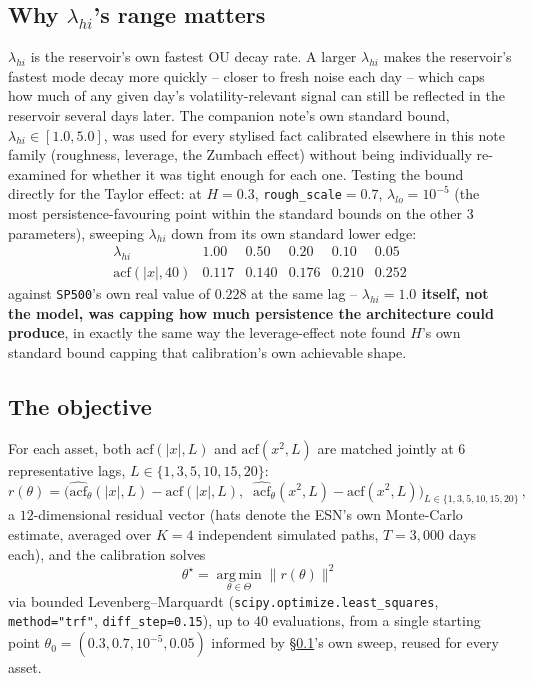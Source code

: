 \documentclass[11pt]{article}
\begin{document}
\subsection{Why $\lambda_{hi}$'s range matters}
\label{sec:whylh}
$\lambda_{hi}$ is the reservoir's own fastest OU decay rate. A larger
$\lambda_{hi}$ makes the reservoir's fastest mode decay more quickly --
closer to fresh noise each day -- which caps how much of any given day's
volatility-relevant signal can still be reflected in the reservoir several
days later. The companion note's own standard bound, $\lambda_{hi}\in[1.0,5.0]$,
was used for every stylised fact calibrated elsewhere in this note family
(roughness, leverage, the Zumbach effect) without being individually
re-examined for whether it was tight enough for each one. Testing the bound
directly for the Taylor effect: at $H=0.3$, \texttt{rough\_scale}$=0.7$,
$\lambda_{lo}=10^{-5}$ (the most persistence-favouring point within the
standard bounds on the other 3 parameters), sweeping $\lambda_{hi}$ down from
its own standard lower edge:
\[
\begin{array}{lcccccc}
\lambda_{hi} & 1.00 & 0.50 & 0.20 & 0.10 & 0.05 \\
\text{acf}(|x|,40) & 0.117 & 0.140 & 0.176 & 0.210 & 0.252
\end{array}
\]
against \texttt{SP500}'s own real value of $0.228$ at the same lag --
\textbf{$\lambda_{hi}=1.0$ itself, not the model, was capping how much
persistence the architecture could produce}, in exactly the same way the
leverage-effect note found $H$'s own standard bound capping that
calibration's own achievable shape.

\subsection{The objective}
For each asset, both $\text{acf}(|x|,L)$ and $\text{acf}(x^2,L)$ are matched
jointly at 6 representative lags, $L\in\{1,3,5,10,15,20\}$:
\begin{equation}
r(\theta) = \Big(\widehat{\text{acf}}_\theta(|x|,L) - \text{acf}(|x|,L),\;\;
\widehat{\text{acf}}_\theta(x^2,L) - \text{acf}(x^2,L)\Big)_{L\in\{1,3,5,10,15,20\}}\, ,
\label{eq:taylorres}
\end{equation}
a $12$-dimensional residual vector (hats denote the ESN's own Monte-Carlo
estimate, averaged over $K=4$ independent simulated paths, $T=3{,}000$ days
each), and the calibration solves
\begin{equation}
\theta^\star = \operatorname*{arg\,min}_{\theta\in\Theta}
\big\lVert r(\theta) \big\rVert^2
\label{eq:taylorargmin}
\end{equation}
via bounded Levenberg--Marquardt (\texttt{scipy.optimize.least\_squares},
\texttt{method="trf"}, \texttt{diff\_step=0.15}), up to $40$ evaluations, from
a single starting point $\theta_0=(0.3,0.7,10^{-5},0.05)$ informed by
\S\ref{sec:whylh}'s own sweep, reused for every asset.
\end{document}
